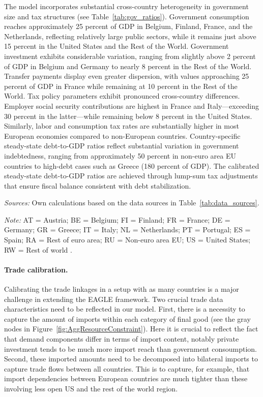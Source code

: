 \documentclass[a4paper,11pt]{article}
\newcommand{\tabnote}[2]{\vspace{2mm}\par\noindent\begin{minipage}{0.9\textwidth}\footnotesize\setlength{\parindent}{0pt}\emph{Sources: }#1\par\vspace{2mm}\emph{Note: }#2\end{minipage}}
\numberwithin{equation}{section}
\newcommand{\CountryCodes}{%
AT = Austria; BE = Belgium; FI = Finland; FR = France; DE = Germany; GR = Greece; IT = Italy; NL = Netherlands; PT = Portugal; ES = Spain; RA = Rest of euro area; RU = Non-euro area EU; US = United States; RW = Rest of world%
}
\begin{document}
The model incorporates substantial cross-country heterogeneity in government size and tax structures (see Table~\ref{tab:gov_ratios}).
Government consumption reaches approximately 25 percent of GDP in Belgium, Finland, France, and the Netherlands, reflecting relatively large public sectors, while it remains just above 15 percent in the United States and the Rest of the World.
Government investment exhibits considerable variation, ranging from slightly above 2 percent of GDP in Belgium and Germany to nearly 8 percent in the Rest of the World.
Transfer payments display even greater dispersion, with values approaching 25 percent of GDP in France while remaining at 10 percent in the Rest of the World.
Tax policy parameters exhibit pronounced cross-country differences.
Employer social security contributions are highest in France and Italy---exceeding 30 percent in the latter---while remaining below 8 percent in the United States.
Similarly, labor and consumption tax rates are substantially higher in most European economies compared to non-European countries.
Country-specific steady-state debt-to-GDP ratios reflect substantial variation in government indebtedness, ranging from approximately 50 percent in non-euro area EU countries to high-debt cases such as Greece (180 percent of GDP).
The calibrated steady-state debt-to-GDP ratios are achieved through lump-sum tax adjustments that ensure fiscal balance consistent with debt stabilization.

\begin{landscape}
    \begin{table}[htbp]
        \centering
        \caption{Steady-State Government Ratios and Tax Rates (Percent of GDP) \label{tab:gov_ratios}}
        \footnotesize
        \renewcommand{\arraystretch}{1.2}
        
        \tabnote{Own calculations based on the data sources in Table~\ref{tab:data_sources}.}{\CountryCodes.}
    \end{table}
\end{landscape}

\paragraph{Trade calibration.} Calibrating the trade linkages in a setup with as many countries is a major challenge in extending the EAGLE framework. Two crucial trade data characteristics need to be reflected in our model. First, there is a necessity to capture the amount of imports within each category of final good (see the gray nodes in Figure~\ref{fig:AggResourceConstraint}). Here it is crucial to reflect the fact that demand components differ in terms of import content, notably private investment tends to be much more import reach than government consoumption. Second, these imported amounts need to be decomposed into bilateral imports to capture trade flows between all countries. This is to capture, for example, that import dependencies between European countries are much tighter than these involving less open US and the rest of the world region.
\end{document}
